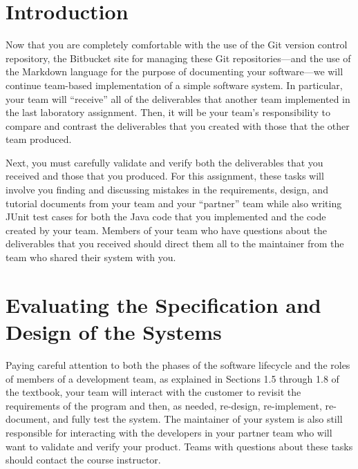 

\usepackage[compact]{titlesec}



\vspace*{-.1in}
\section*{Introduction}

Now that you are completely comfortable with the use of the Git version control repository, the Bitbucket site for managing
these Git repositories---and the use of the Markdown language for the purpose of documenting your software---we will
continue team-based implementation of a simple software system. In particular, your team will ``receive'' all of the
deliverables that another team implemented in the last laboratory assignment. Then, it will be your team's
responsibility to compare and contrast the deliverables that you created with those that the other team produced.

Next, you must carefully validate and verify both the deliverables that you received and those that you produced. For
this assignment, these tasks will involve you finding and discussing mistakes in the requirements, design, and tutorial
documents from your team and your ``partner'' team while also writing JUnit test cases for both the Java code that you
implemented and the code created by your team. Members of your team who have questions about the deliverables that you
received should direct them all to the maintainer from the team who shared their system with you.

\section*{Evaluating the Specification and Design of the Systems}

Paying careful attention to both the phases of the software lifecycle and the roles of members of a development team, as
explained in Sections 1.5 through 1.8 of the textbook, your team will interact with the customer to revisit the
requirements of the program and then, as needed, re-design, re-implement, re-document, and fully test the system.  The
maintainer of your system is also still responsible for interacting with the developers in your partner team who will
want to validate and verify your product. Teams with questions about these tasks should contact the course instructor.

